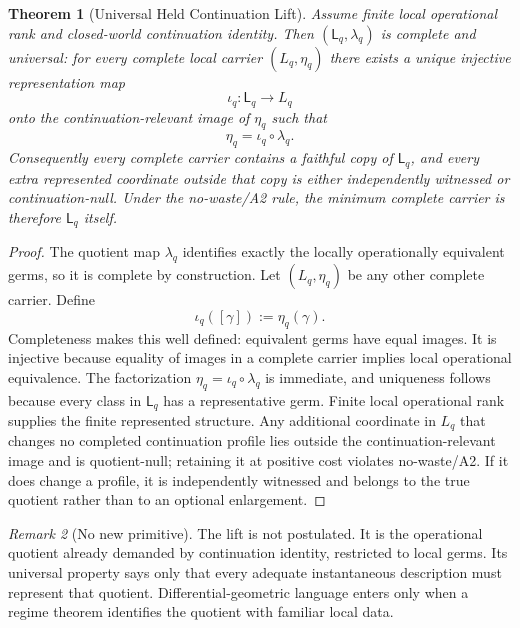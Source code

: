 \documentclass[11pt]{article}
\newtheorem{theorem}{Theorem}[section]
\theoremstyle{remark}
\newtheorem{remark}[theorem]{Remark}
\begin{document}
\begin{theorem}[Universal Held Continuation Lift]\label{thm:minimal-continuation-lift}
Assume finite local operational rank and closed-world continuation identity.  Then $(\mathsf L_q,\lambda_q)$ is complete and universal: for every complete local carrier $(L_q,\eta_q)$ there exists a unique injective representation map
\[
        \iota_q:\mathsf L_q\longrightarrow L_q
\]
onto the continuation-relevant image of $\eta_q$ such that
\[
        \eta_q=\iota_q\circ\lambda_q.
\]
Consequently every complete carrier contains a faithful copy of $\mathsf L_q$, and every extra represented coordinate outside that copy is either independently witnessed or continuation-null.  Under the no-waste/A2 rule, the minimum complete carrier is therefore $\mathsf L_q$ itself.
\end{theorem}

\begin{proof}
The quotient map $\lambda_q$ identifies exactly the locally operationally equivalent germs, so it is complete by construction.  Let $(L_q,\eta_q)$ be any other complete carrier.  Define
\[
        \iota_q([\gamma]):=\eta_q(\gamma).
\]
Completeness makes this well defined: equivalent germs have equal images.  It is injective because equality of images in a complete carrier implies local operational equivalence.  The factorization $\eta_q=\iota_q\circ\lambda_q$ is immediate, and uniqueness follows because every class in $\mathsf L_q$ has a representative germ.  Finite local operational rank supplies the finite represented structure.  Any additional coordinate in $L_q$ that changes no completed continuation profile lies outside the continuation-relevant image and is quotient-null; retaining it at positive cost violates no-waste/A2.  If it does change a profile, it is independently witnessed and belongs to the true quotient rather than to an optional enlargement.
\end{proof}

\begin{remark}[No new primitive]
The lift is not postulated.  It is the operational quotient already demanded by continuation identity, restricted to local germs.  Its universal property says only that every adequate instantaneous description must represent that quotient.  Differential-geometric language enters only when a regime theorem identifies the quotient with familiar local data.
\end{remark}
\end{document}
